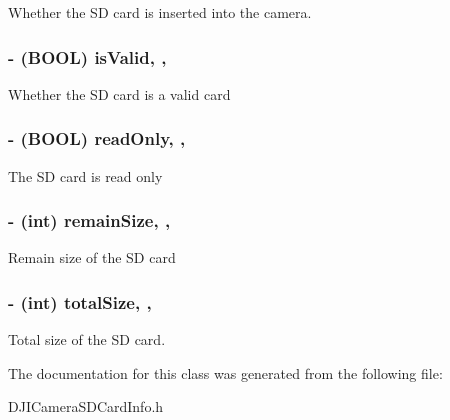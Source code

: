Whether the S\+D card is inserted into the camera. \hypertarget{interface_d_j_i_camera_s_d_card_info_af59a91c8c2d10546da7168d7d10310ed}{
\subsubsection[{is\+Valid}]{\setlength{\rightskip}{0pt plus 5cm}-\/ (B\+O\+O\+L) is\+Valid\hspace{0.3cm}{\ttfamily [read]}, {\ttfamily [nonatomic]}, {\ttfamily [assign]}}}\label{interface_d_j_i_camera_s_d_card_info_af59a91c8c2d10546da7168d7d10310ed}
Whether the S\+D card is a valid card \hypertarget{interface_d_j_i_camera_s_d_card_info_a3e3d67655f38d71c0aab6ae7a132e396}{
\subsubsection[{read\+Only}]{\setlength{\rightskip}{0pt plus 5cm}-\/ (B\+O\+O\+L) read\+Only\hspace{0.3cm}{\ttfamily [read]}, {\ttfamily [nonatomic]}, {\ttfamily [assign]}}}\label{interface_d_j_i_camera_s_d_card_info_a3e3d67655f38d71c0aab6ae7a132e396}
The S\+D card is read only \hypertarget{interface_d_j_i_camera_s_d_card_info_aa44ca2930b598e41704aaa9ba67c95dc}{
\subsubsection[{remain\+Size}]{\setlength{\rightskip}{0pt plus 5cm}-\/ (int) remain\+Size\hspace{0.3cm}{\ttfamily [read]}, {\ttfamily [nonatomic]}, {\ttfamily [assign]}}}\label{interface_d_j_i_camera_s_d_card_info_aa44ca2930b598e41704aaa9ba67c95dc}
Remain size of the S\+D card \hypertarget{interface_d_j_i_camera_s_d_card_info_a880e1b513893d27cc94c83e405a72667}{
\subsubsection[{total\+Size}]{\setlength{\rightskip}{0pt plus 5cm}-\/ (int) total\+Size\hspace{0.3cm}{\ttfamily [read]}, {\ttfamily [nonatomic]}, {\ttfamily [assign]}}}\label{interface_d_j_i_camera_s_d_card_info_a880e1b513893d27cc94c83e405a72667}
Total size of the S\+D card. 

The documentation for this class was generated from the following file\+:\begin{DoxyCompactItemize}
\item 
D\+J\+I\+Camera\+S\+D\+Card\+Info.\+h\end{DoxyCompactItemize}
